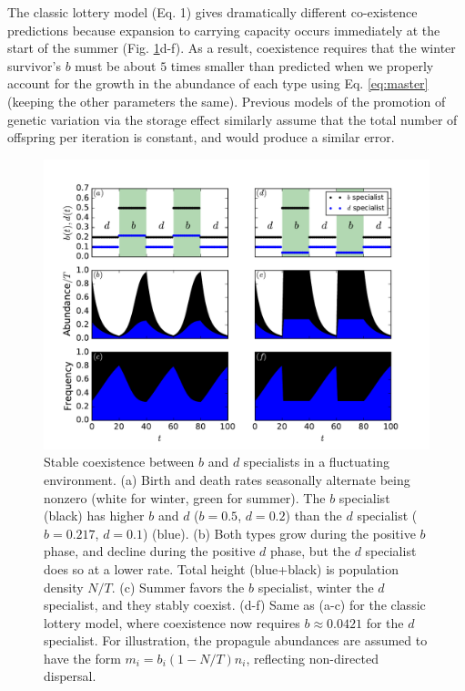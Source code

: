 \documentclass[11pt]{article}
\begin{document}
The classic lottery model (Eq. 1) gives dramatically different co-existence predictions because expansion to carrying capacity occurs immediately at the start of the summer (Fig. \ref{fig:fluctuatingselection}d-f). As a result, coexistence requires that the winter survivor's $b$ must be about $5$ times smaller than predicted when we properly account for the growth in the abundance of each type using Eq. \eqref{eq:master} (keeping the other parameters the same). Previous models of the promotion of genetic variation via the storage effect  \citep{ellner_1994} similarly assume that the total number of offspring per iteration is constant, and would produce a similar error. 


\begin{figure}
\centering
\includegraphics[scale=0.7]{fluctuatingselection.pdf}
\caption{\label{fig:fluctuatingselection} Stable coexistence between $b$ and $d$ specialists in a fluctuating environment. (a) Birth and death rates seasonally alternate being nonzero (white for winter, green for summer). The $b$ specialist (black) has higher $b$ and $d$ ($b=0.5$, $d=0.2$) than the $d$ specialist ($b=0.217$, $d=0.1$) (blue). (b) Both types grow during the positive $b$ phase, and decline during the positive $d$ phase, but the $d$ specialist does so at a lower rate. Total height (blue+black) is population density $N/T$. (c) Summer favors the $b$ specialist, winter the $d$ specialist, and they stably coexist. (d-f) Same as (a-c) for the classic lottery model, where coexistence now requires $b\approx 0.0421$ for the $d$ specialist. For illustration, the propagule abundances are assumed to have the form $m_i=b_i(1-N/T)n_i$, reflecting non-directed dispersal.} 
\end{figure}
\end{document}
